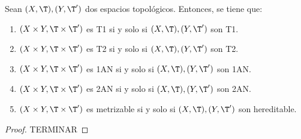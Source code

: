 \begin{prop}
    Sean $(X,\T), (Y,\T')$ dos espacios topológicos. Entonces, se tiene que:
    \begin{enumerate}
        \item $(X\times Y, \T\times \T')$ es T1 si y solo si $(X,\T), (Y,\T')$ son T1.
        \item $(X\times Y, \T\times \T')$ es T2 si y solo si $(X,\T), (Y,\T')$ son T2.
        \item $(X\times Y, \T\times \T')$ es 1AN si y solo si $(X,\T), (Y,\T')$ son 1AN.
        \item $(X\times Y, \T\times \T')$ es 2AN si y solo si $(X,\T), (Y,\T')$ son 2AN.
        \item $(X\times Y, \T\times \T')$ es metrizable si y solo si $(X,\T), (Y,\T')$ son hereditable.
    \end{enumerate}
\end{prop}
\begin{proof}
TERMINAR
\begin{comment}
     Hacia la derecha, se usa que esas propiedades son hereditarias. Es consecuencia de la proposición anterior.

    Las de 1AN y 2AN ya están demostradas.
\end{comment}
\end{proof}


